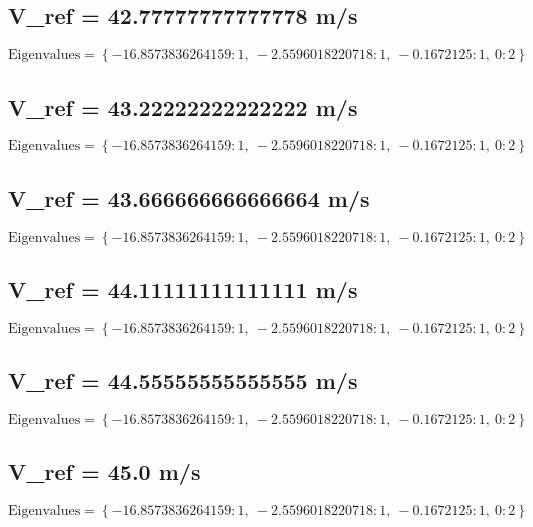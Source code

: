 \documentclass{article}
\begin{document}
\subsection*{V_ref = 42.77777777777778 m/s}
\begin{equation}
\text{Eigenvalues} = \left\{ -16.8573836264159 : 1, \  -2.5596018220718 : 1, \  -0.1672125 : 1, \  0 : 2\right\}
\end{equation}
\subsection*{V_ref = 43.22222222222222 m/s}
\begin{equation}
\text{Eigenvalues} = \left\{ -16.8573836264159 : 1, \  -2.5596018220718 : 1, \  -0.1672125 : 1, \  0 : 2\right\}
\end{equation}
\subsection*{V_ref = 43.666666666666664 m/s}
\begin{equation}
\text{Eigenvalues} = \left\{ -16.8573836264159 : 1, \  -2.5596018220718 : 1, \  -0.1672125 : 1, \  0 : 2\right\}
\end{equation}
\subsection*{V_ref = 44.11111111111111 m/s}
\begin{equation}
\text{Eigenvalues} = \left\{ -16.8573836264159 : 1, \  -2.5596018220718 : 1, \  -0.1672125 : 1, \  0 : 2\right\}
\end{equation}
\subsection*{V_ref = 44.55555555555555 m/s}
\begin{equation}
\text{Eigenvalues} = \left\{ -16.8573836264159 : 1, \  -2.5596018220718 : 1, \  -0.1672125 : 1, \  0 : 2\right\}
\end{equation}
\subsection*{V_ref = 45.0 m/s}
\begin{equation}
\text{Eigenvalues} = \left\{ -16.8573836264159 : 1, \  -2.5596018220718 : 1, \  -0.1672125 : 1, \  0 : 2\right\}
\end{equation}
\end{document}
